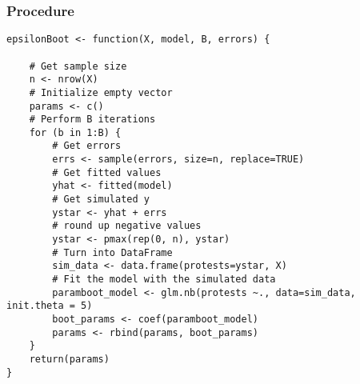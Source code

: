\documentclass[12pt]{article}
\begin{document}
\subsubsection*{Procedure}

\begin{lstlisting}
epsilonBoot <- function(X, model, B, errors) {

    # Get sample size
    n <- nrow(X)
    # Initialize empty vector
    params <- c()
    # Perform B iterations
    for (b in 1:B) {
        # Get errors
        errs <- sample(errors, size=n, replace=TRUE)
        # Get fitted values
        yhat <- fitted(model)
        # Get simulated y
        ystar <- yhat + errs
        # round up negative values
        ystar <- pmax(rep(0, n), ystar)
        # Turn into DataFrame
        sim_data <- data.frame(protests=ystar, X)
        # Fit the model with the simulated data
        paramboot_model <- glm.nb(protests ~., data=sim_data, init.theta = 5)
        boot_params <- coef(paramboot_model)
        params <- rbind(params, boot_params)
    }
    return(params)
}
\end{lstlisting}
\end{document}
